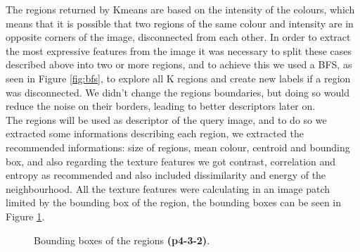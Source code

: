 \documentclass[12pt,a4paper]{article}
\begin{document}
	The regions returned by Kmeans are based on the intensity of the colours, which means that it is possible that two regions of the same colour and intensity are in opposite corners of the image, disconnected from each other. In order to extract the most expressive features from the image it was necessary to split these cases described above into two or more regions, and to achieve this we used a BFS, as seen in Figure \ref{fig:bfs}, to explore all K regions and create new labels if a region was disconnected. We didn't change the regions boundaries, but doing so would reduce the noise on their borders, leading to better descriptors later on.\\

	The regions will be used as descriptor of the query image, and to do so we extracted some informations describing each region, we extracted the recommended informations: size of regions, mean colour, centroid and bounding box, and also regarding the texture features we got contrast, correlation and entropy as recommended and also included dissimilarity and energy of the neighbourhood. All the texture features were calculating in an image patch limited by the bounding box of the region, the bounding boxes can be seen in Figure \ref{fig:bbox}.

\begin{figure}[!h]
	\centering
		{
			\setlength{\fboxsep}{1pt}
			\setlength{\fboxrule}{1pt}
		}
	\caption{Bounding boxes of the regions \textbf{(p4-3-2)}.}
	\label{fig:bbox}
\end{figure}
\end{document}
